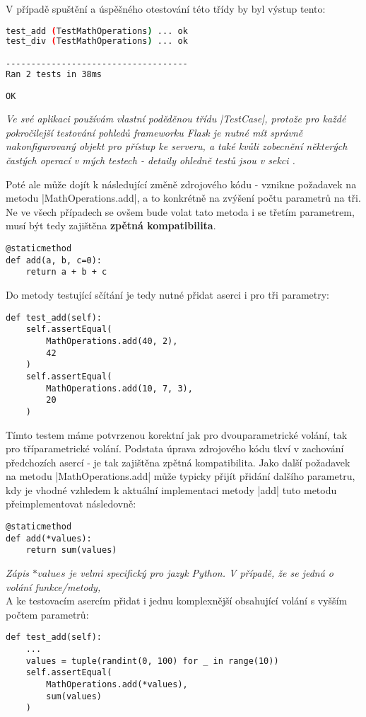 V případě spuštění a úspěšného otestování této třídy by byl výstup tento:
\begin{lstlisting}[language=bash, caption={Ukázka výstupu ze spuštění testů}]
test_add (TestMathOperations) ... ok
test_div (TestMathOperations) ... ok

------------------------------------
Ran 2 tests in 38ms

OK
\end{lstlisting}


{\itshape
	Ve své aplikaci používám vlastní poděděnou třídu \ic|TestCase|, protože pro každé pokročilejší testování pohledů frameworku Flask je nutné mít správně nakonfigurovaný objekt pro  přístup ke serveru, a také kvůli zobecnění některých častých operací v mých testech - detaily ohledně testů jsou v sekci .
}


Poté ale může dojít k následující změně zdrojového k\'{o}du - vznikne požadavek na metodu \ic|MathOperations.add|, a to konkrétně na zvýšení počtu parametrů na tři. Ne ve všech případech se ovšem bude volat tato metoda i se třetím parametrem, musí být tedy zajištěna \textbf{zpětná kompatibilita}.
\begin{lstlisting}[caption={Vylepšená implementace metoda MathOperations.add}]
@staticmethod
def add(a, b, c=0):
	return a + b + c
\end{lstlisting}
Do metody testující sčítání je tedy nutné přidat aserci i pro tři parametry:
\begin{lstlisting}[caption={Testovací metoda pro upravenou implementaci MathOperations.add}]
def test_add(self):
	self.assertEqual(
		MathOperations.add(40, 2),
		42
	)
	self.assertEqual(
		MathOperations.add(10, 7, 3),
		20
	)
\end{lstlisting}
Tímto testem máme potvrzenou korektní jak pro dvouparametrické volání, tak pro  tříparametrické volání. Podstata úprava zdrojového kódu tkví v zachování předchozích asercí - je tak zajištěna zpětná kompatibilita. Jako další požadavek na metodu \ic|MathOperations.add| může typicky přijít přidání dalšího parametru, kdy je vhodné vzhledem k aktuální implementaci metody \ic|add| tuto metodu přeimplementovat následovně:
\begin{lstlisting}[caption={Finální implementace metody MathOperations.add}]
@staticmethod
def add(*values):
	return sum(values)
\end{lstlisting}
\textit{
  Zápis $*values$ je velmi specifický pro jazyk Python. V případě, že se jedná o volání funkce/metody, 
} \\
A ke testovacím asercím přidat i jednu komplexnější obsahující volání s vyšším počtem parametrů:
\begin{lstlisting}[caption={Finální test pro metodu MathOperations.add}]
def test_add(self):
	...
	values = tuple(randint(0, 100) for _ in range(10))
	self.assertEqual(
		MathOperations.add(*values),
		sum(values)
	)
\end{lstlisting}
